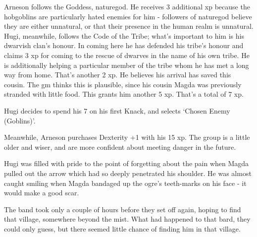 \begin{exampletext}
Arneson follows the Goddess, \gls{naturegod}.
He receives 3 additional \gls{xp} because the hobgoblins are particularly hated enemies for him - followers of \gls{naturegod} believe they are either unnatural, or that their presence in the human realm is unnatural.
Hugi, meanwhile, follows the Code of the Tribe; what's important to him is his dwarvish clan's honour.
In coming here he has defended his tribe's honour and claims 3 \gls{xp} for coming to the rescue of dwarves in the name of his own tribe.
He is additionally helping a particular member of the tribe whom he has met a long way from home.
That's another 2 \gls{xp}.
He believes his arrival has saved this cousin.
The \gls{gm} thinks this is plausible, since his cousin Magda was previously stranded with little food.
This grants him another 5 \gls{xp}.
That's a total of 7 \gls{xp}.

Hugi decides to spend his 7 on his first Knack, and selects `Chosen Enemy (Goblins)'.

Meanwhile, Arneson purchases Dexterity +1 with his 15 \gls{xp}. The group is a little older and wiser, and are more confident about meeting danger in the future.

Hugi was filled with pride to the point of forgetting about the pain when Magda pulled out the arrow which had so deeply penetrated his shoulder. He was almost caught smiling when Magda bandaged up the ogre's teeth-marks on his face - it would make a good scar.

The band took only a couple of hours before they set off again, hoping to find that village, somewhere beyond the mist. What had happened to that bard, they could only guess, but there seemed little chance of finding him in that village.


\end{exampletext}

